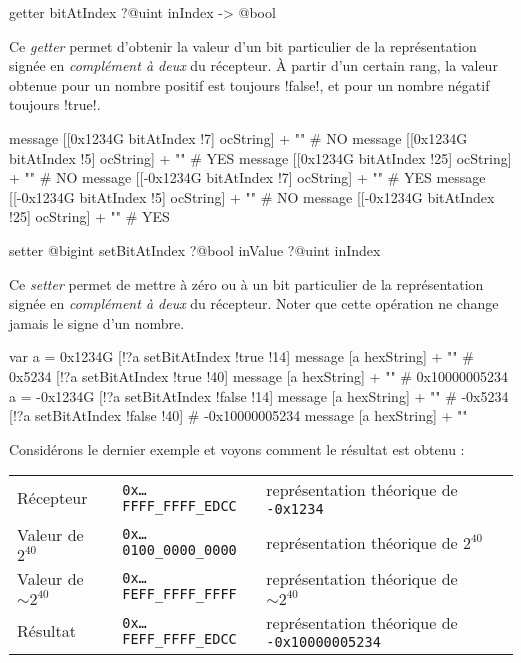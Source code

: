 \begin{galgasbox}
getter bitAtIndex ?@uint inIndex -> @bool
\end{galgasbox}

Ce \emph{getter} permet d'obtenir la valeur d'un bit particulier de la représentation signée en \emph{complément à deux} du récepteur. À partir d'un certain rang, la valeur obtenue pour un nombre positif est toujours \ggs!false!, et pour un nombre négatif toujours \ggs!true!.

\begin{galgas}
message [[0x1234G bitAtIndex !7] ocString] + "\n" # NO
message [[0x1234G bitAtIndex !5] ocString] + "\n" # YES
message [[0x1234G bitAtIndex !25] ocString] + "\n" # NO
message [[-0x1234G bitAtIndex !7] ocString] + "\n" # YES
message [[-0x1234G bitAtIndex !5] ocString] + "\n" # NO
message [[-0x1234G bitAtIndex !25] ocString] + "\n" # YES
\end{galgas}


\begin{galgasbox}
setter @bigint setBitAtIndex ?@bool inValue ?@uint inIndex
\end{galgasbox}

Ce \emph{setter} permet de mettre à zéro ou à un bit particulier de la représentation signée en \emph{complément à deux} du récepteur. Noter que cette opération ne change jamais le signe d'un nombre.

\begin{galgas}
var a = 0x1234G
[!?a setBitAtIndex !true !14]
message [a hexString] + "\n" # 0x5234
[!?a setBitAtIndex !true !40]
message [a hexString] + "\n" # 0x10000005234
a = -0x1234G
[!?a setBitAtIndex !false !14]
message [a hexString] + "\n" # -0x5234
[!?a setBitAtIndex !false !40] # -0x10000005234
message [a hexString] + "\n"
\end{galgas}

Considérons le dernier exemple et voyons comment le résultat est obtenu :

\begin{tabular}{llll}
Récepteur & \texttt{0x…FFFF\_FFFF\_EDCC} & représentation théorique de \texttt{-0x1234}\\
Valeur de $2^{40}$ & \texttt{0x…0100\_0000\_0000} & représentation théorique de $2^{40}$ \\
Valeur de $\sim2^{40}$ & \texttt{0x…FEFF\_FFFF\_FFFF} & représentation théorique de $\sim2^{40}$ \\
Résultat & \texttt{0x…FEFF\_FFFF\_EDCC} & représentation théorique de \texttt{-0x10000005234} \\
\end{tabular}


